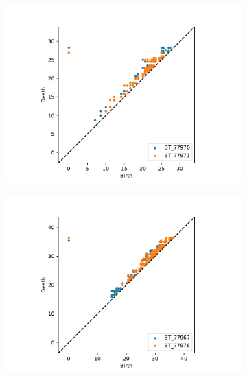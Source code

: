 \begin{figure}[ht]
  \centering
  \begin{subfigure}{.49 \linewidth}
  \includegraphics[scale=0.5]{matchings/77970-77971.pdf}
  \end{subfigure}%
  \begin{subfigure}{.49 \linewidth}
  \includegraphics[scale=0.5]{matchings/77967-77976.pdf}
  \end{subfigure}
  \begin{subfigure}{.49 \linewidth}

\end{subfigure}
\end{figure}
